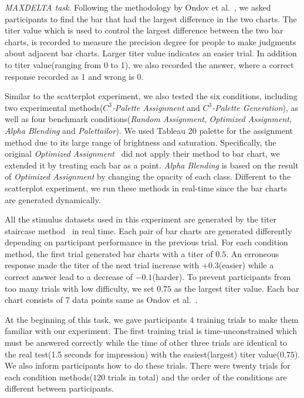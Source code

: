 \emph{MAXDELTA task}. Following the methodology by Ondov et al.~\cite{Ondov19}, we asked participants to find the bar that had the largest difference in the two charts. The titer value which is used to control the largest difference between the two bar charts, is recorded to measure the precision degree for people to make judgments about adjacent bar charts. Larger titer value indicates an easier trial. In addition to titer value(ranging from 0 to 1), we also recorded the answer, where a correct response recorded as 1 and wrong is 0.


Similar to the scatterplot experiment, we also tested the six conditions, including two experimental methods(\emph{$C^3$-Palette Assignment} and \emph{$C^3$-Palette Generation}), as well as four benchmark conditions(\emph{Random Assignment}, \emph{Optimized Assignment}, \emph{Alpha Blending} and \emph{Palettailor}). We used Tableau 20 palette for the assignment method due to its large range of brightness and saturation. Specifically, the original \emph{Optimized Assignment}~\cite{Wang2018} did not apply their method to bar chart, we extended it by treating each bar as a point. \emph{Alpha Blending} is based on the result of \emph{Optimized Assignment} by changing the opacity of each class. Different to the scatterplot experiment, we run these methods in real-time since the bar charts are generated dynamically.

All the stimulus datasets used in this experiment are generated by the titer staircase method~\cite{Ondov19} in real time. Each pair of bar charts are generated differently depending on participant performance in the previous trial. For each condition method, the first trial generated bar charts with a titer of $0.5$. An erroneous response made the titer of the next trial increase with $+0.3$(easier) while a correct answer lead to a decrease of $-0.1$(harder). To prevent participants from too many trials with low difficulty, we set $0.75$ as the largest titer value. Each bar chart consists of 7 data points same as Ondov et al.~\cite{Ondov19}.

At the beginning of this task, we gave participants $4$ training trials to make them familiar with our experiment. The first training trial is time-unconstrained which must be answered correctly while the time of other three trials are identical to the real test(1.5 seconds for impression) with the easiest(largest) titer value($0.75$). We also inform participants how to do these trials. There were twenty trials for each condition methods($120$ trials in total) and the order of the conditions are different between participants.

